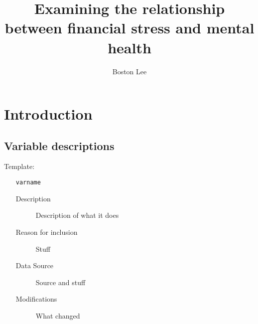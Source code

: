 \documentclass{article}
\title{Examining the relationship between financial stress and mental health}
\author{Boston Lee}
\begin{document}
\maketitle

\section{Introduction}

\subsection{Variable descriptions}

Template:

\begin{itemize}
	\item[\texttt{varname}]
	      \begin{description}
		      \item[Description] Description of what it does
		      \item[Reason for inclusion] Stuff
		      \item[Data Source] Source and stuff
		      \item[Modifications] What changed
	      \end{description}
\end{itemize}
\end{document}
